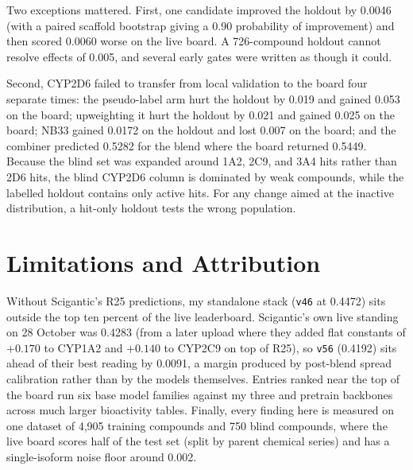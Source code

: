 \documentclass[11pt]{article}
\begin{document}
Two exceptions mattered. First, one candidate improved the holdout by 0.0046 (with a paired scaffold bootstrap giving a 0.90 probability of improvement) and then scored 0.0060 worse on the live board. A 726-compound holdout cannot resolve effects of 0.005, and several early gates were written as though it could.

Second, CYP2D6 failed to transfer from local validation to the board four separate times: the pseudo-label arm hurt the holdout by 0.019 and gained 0.053 on the board; upweighting it hurt the holdout by 0.021 and gained 0.025 on the board; NB33 gained 0.0172 on the holdout and lost 0.007 on the board; and the combiner predicted 0.5282 for the blend where the board returned 0.5449. Because the blind set was expanded around 1A2, 2C9, and 3A4 hits rather than 2D6 hits, the blind CYP2D6 column is dominated by weak compounds, while the labelled holdout contains only active hits. For any change aimed at the inactive distribution, a hit-only holdout tests the wrong population.

\section{Limitations and Attribution}

Without Scigantic's R25 predictions, my standalone stack (\texttt{v46} at 0.4472) sits outside the top ten percent of the live leaderboard. Scigantic's own live standing on 28 October was 0.4283 (from a later upload where they added flat constants of $+0.170$ to CYP1A2 and $+0.140$ to CYP2C9 on top of R25), so \texttt{v56} (0.4192) sits ahead of their best reading by 0.0091, a margin produced by post-blend spread calibration rather than by the models themselves. Entries ranked near the top of the board run six base model families against my three and pretrain backbones across much larger bioactivity tables. Finally, every finding here is measured on one dataset of 4,905 training compounds and 750 blind compounds, where the live board scores half of the test set (split by parent chemical series) and has a single-isoform noise floor around 0.002.
\end{document}
